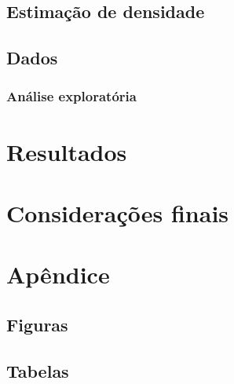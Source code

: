 \documentclass[article]{abntex2}
\begin{document}
\subsection{Estimação de densidade}
\subsection{Dados}
\subsubsection{Análise exploratória}

\section{Resultados}

\section{Considerações finais}



% 

\newpage



\newpage
\section{Apêndice}
\subsection{Figuras}
\subsection{Tabelas}
\end{document}
